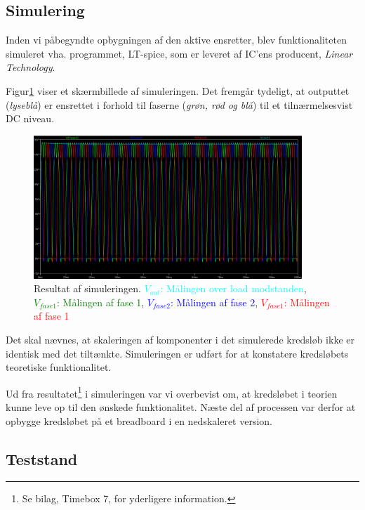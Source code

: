 \subsection{Simulering}
\label{sec:simulering}

Inden vi påbegyndte opbygningen af den aktive ensretter, blev funktionaliteten simuleret vha. programmet, LT-spice, som er leveret af IC’ens producent, \textit{Linear Technology}.

Figur\ref{fig:prens6} viser et skærmbillede af simuleringen. Det fremgår tydeligt, at outputtet (\textit{lyseblå}) er ensrettet i forhold til faserne (\textit{grøn, rød og blå}) til et tilnærmelsesvist DC niveau. 

\begin{figure}[h]
  \centering
  \includegraphics[width=0.9\textwidth]{./figurer/prens6.png}
  \caption{Resultat af simuleringen. \textcolor{cyan}{$V_{out}$: Målingen over load modstanden}, \textcolor{green}{$V_{fase1}$: Målingen af fase 1}, \textcolor{blue}{$V_{fase2}$: Målingen af fase 2}, \textcolor{red}{$V_{fase1}$: Målingen af fase 1}}
  \label{fig:prens6}
\end{figure}

Det skal nævnes, at skaleringen af komponenter i det simulerede kredsløb ikke er identisk med det tiltænkte. Simuleringen er udført for at konstatere kredsløbets teoretiske funktionalitet.

Ud fra resultatet\footnote{Se bilag, Timebox 7, for yderligere information.} i simuleringen var vi overbevist om, at kredsløbet i teorien kunne leve op til den ønskede funktionalitet. Næste del af processen var derfor at opbygge kredsløbet på et breadboard i en nedskaleret version.

\subsection{Teststand}
\label{sec:teststand}

